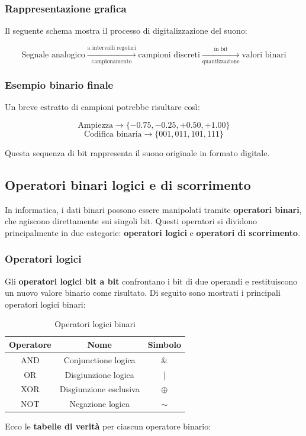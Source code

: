 \documentclass[12pt]{article}
\begin{document}
\subsubsection{Rappresentazione grafica}

Il seguente schema mostra il processo di digitalizzazione del suono:

\[
\text{Segnale analogico} \xrightarrow[\text{campionamento}]{\text{a intervalli regolari}} \text{campioni discreti} \xrightarrow[\text{quantizzazione}]{\text{in bit}} \text{valori binari}
\]


\subsubsection{Esempio binario finale}

Un breve estratto di campioni potrebbe risultare così:

\[
\text{Ampiezza} \rightarrow \{ -0.75, -0.25, +0.50, +1.00 \}
\]
\[
\text{Codifica binaria} \rightarrow \{ 001, 011, 101, 111 \}
\]

Questa sequenza di bit rappresenta il suono originale in formato digitale.

\subsection{Operatori binari logici e di scorrimento}

In informatica, i dati binari possono essere manipolati tramite \textbf{operatori binari}, che agiscono direttamente sui singoli bit.  
Questi operatori si dividono principalmente in due categorie: \textbf{operatori logici} e \textbf{operatori di scorrimento}.

\subsubsection{Operatori logici}

Gli \textbf{operatori logici bit a bit} confrontano i bit di due operandi e restituiscono un nuovo valore binario come risultato.  
Di seguito sono mostrati i principali operatori logici binari:

\begin{table}[h]
\centering
\begin{tabular}{|c|c|c|}
\hline
\textbf{Operatore} & \textbf{Nome} & \textbf{Simbolo} \\
\hline
AND & Conjunctione logica & \& \\
OR & Disgiunzione logica & |\\
XOR & Disgiunzione esclusiva & $\oplus$  \\
NOT & Negazione logica & $\sim$ \\
\hline
\end{tabular}
\caption{Operatori logici binari}
\end{table}
Ecco le \textbf{tabelle di verità} per ciascun operatore binario:
\end{document}
